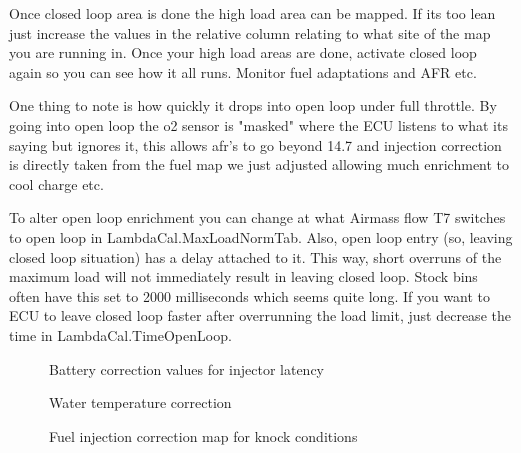 \documentclass[11pt,a4paper]{book}
\begin{document}
Once closed loop area is done the high load area can be mapped. If its too lean just increase the
values in the relative column relating to what site of the map you are running in. Once your high load
areas are done, activate closed loop again so you can see how it all runs. Monitor fuel adaptations and
AFR etc.

One thing to note is how quickly it drops into open loop under full throttle.
By going into open loop the o2 sensor is "masked" where the ECU listens to what its saying but
ignores it, this allows afr's to go beyond 14.7 and injection correction is directly taken from the fuel
map we just adjusted allowing much enrichment to cool charge etc.

To alter open loop enrichment you can change at what Airmass flow T7 switches to open loop in
LambdaCal.MaxLoadNormTab. Also, open loop entry (so, leaving closed loop situation) has a delay
attached to it. This way, short overruns of the maximum load will not immediately result in leaving
closed loop. Stock bins often have this set to 2000 milliseconds which seems quite long. If you want
to ECU to leave closed loop faster after overrunning the load limit, just decrease the time in
LambdaCal.TimeOpenLoop.
\begin{figure}[<+htpb+>]
    \centering
    \missingfigure{}
    \caption{Battery correction values for injector latency}
    \label{fig:}
\end{figure}

\begin{figure}[<+htpb+>]
    \centering
    \missingfigure{}
    \caption{Water temperature correction}
    \label{fig:}
\end{figure}


\begin{figure}[<+htpb+>]
    \centering
    \missingfigure{}
    \caption{Fuel injection correction map for knock conditions}
    \label{fig:}
\end{figure}
\end{document}
